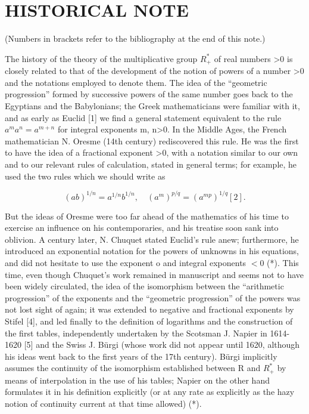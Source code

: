 \section*{HISTORICAL NOTE}
{}

(Numbers in brackets refer to the bibliography at the end of this note.)

The history of the theory of the multiplicative group \(R_{+}^{*}\) of real numbers \textgreater0 is closely related to that of the development of the notion of powers of a number \textgreater0 and the notations employed to denote them. The idea of the ``geometric progression'' formed by successive powers of the same number goes back to the Egyptians and the Babylonians; the Greek mathematicians were familiar with it, and as early as Euclid {[}1{]} we find a general statement equivalent to the rule \(a^{m}a^{n}=a^{m+n}\) for integral exponents m, n\textgreater0. In the Middle Ages, the French mathematician N. Oresme (14th century) rediscovered this rule. He was the first to have the idea of a fractional exponent \textgreater0, with a notation similar to our own and to our relevant rules of calculation, stated in general terms; for example, he used the two rules which we should write as

\[
(a b) ^ {1 / n} = a ^ {1 / n} b ^ {1 / n}, \quad (a ^ {m}) ^ {p / q} = (a ^ {m p}) ^ {1 / q} [ 2 ].
\]

But the ideas of Oresme were too far ahead of the mathematics of his time to exercise an influence on his contemporaries, and his treatise soon sank into oblivion. A century later, N. Chuquet stated Euclid's rule anew; furthermore, he introduced an exponential notation for the powers of unknowns in his equations, and did not hesitate to use the exponent o and integral exponents \(< 0\) (*). This time, even though Chuquet's work remained in manuscript and seems not to have been widely circulated, the idea of the isomorphism between the ``arithmetic progression'' of the exponents and the ``geometric progression'' of the powers was not lost sight of again; it was extended to negative and fractional exponents by Stifel {[}4{]}, and led finally to the definition of logarithms and the construction of the first tables, independently undertaken by the Scotsman J. Napier in 1614-1620 {[}5{]} and the Swiss J. Bürgi (whose work did not appear until 1620, although his ideas went back to the first years of the 17th century). Bürgi implicitly assumes the continuity of the isomorphism established between R and \(R^{*}_{+}\) by means of interpolation in the use of his tables; Napier on the other hand formulates it in his definition explicitly (or at any rate as explicitly as the hazy notion of continuity current at that time allowed) (*).

